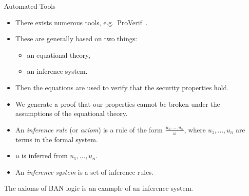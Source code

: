 \documentclass{beamer}
\theoremstyle{definition}
\theoremstyle{remark}
\begin{document}
\begin{frame}
  \begin{block}{Automated 
      Tools}
    \begin{itemize}
      \item There exists numerous tools, e.g.\ ProVerif~\cite{ProVerif}.
      \item These are generally based on two things:
        \begin{itemize}
          \item an equational theory,
          \item an inference system.
        \end{itemize}

      \item Then the equations are used to verify that the security properties 
        hold.

      \item We generate a proof that our properties cannot be broken under the 
        assumptions of the equational theory.
    \end{itemize}
  \end{block}
\end{frame}

\begin{frame}
  \begin{definition}
    \begin{itemize}
      \item An \emph{inference rule} (or \emph{axiom}) is a rule of the form 
        \(\frac{u_1, \ldots, u_n}{u}\), where \(u_1, \ldots, u_n\) are terms in 
        the formal system.
      \item \(u\) is inferred from \(u_1, \ldots, u_n\).
      \item An \emph{inference system} is a set of inference rules.
    \end{itemize}
  \end{definition}

  \pause{}
  
  \begin{example}
    The axioms of BAN logic is an example of an inference system.
  \end{example}
\end{frame}
\end{document}
